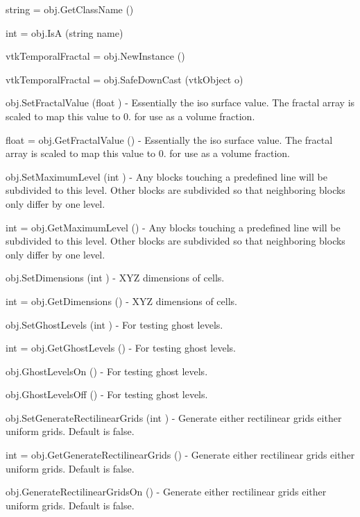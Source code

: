\begin{DoxyItemize}
\item {\ttfamily string = obj.\-Get\-Class\-Name ()}  
\item {\ttfamily int = obj.\-Is\-A (string name)}  
\item {\ttfamily vtk\-Temporal\-Fractal = obj.\-New\-Instance ()}  
\item {\ttfamily vtk\-Temporal\-Fractal = obj.\-Safe\-Down\-Cast (vtk\-Object o)}  
\item {\ttfamily obj.\-Set\-Fractal\-Value (float )} -\/ Essentially the iso surface value. The fractal array is scaled to map this value to 0. for use as a volume fraction.  
\item {\ttfamily float = obj.\-Get\-Fractal\-Value ()} -\/ Essentially the iso surface value. The fractal array is scaled to map this value to 0. for use as a volume fraction.  
\item {\ttfamily obj.\-Set\-Maximum\-Level (int )} -\/ Any blocks touching a predefined line will be subdivided to this level. Other blocks are subdivided so that neighboring blocks only differ by one level.  
\item {\ttfamily int = obj.\-Get\-Maximum\-Level ()} -\/ Any blocks touching a predefined line will be subdivided to this level. Other blocks are subdivided so that neighboring blocks only differ by one level.  
\item {\ttfamily obj.\-Set\-Dimensions (int )} -\/ X\-Y\-Z dimensions of cells.  
\item {\ttfamily int = obj.\-Get\-Dimensions ()} -\/ X\-Y\-Z dimensions of cells.  
\item {\ttfamily obj.\-Set\-Ghost\-Levels (int )} -\/ For testing ghost levels.  
\item {\ttfamily int = obj.\-Get\-Ghost\-Levels ()} -\/ For testing ghost levels.  
\item {\ttfamily obj.\-Ghost\-Levels\-On ()} -\/ For testing ghost levels.  
\item {\ttfamily obj.\-Ghost\-Levels\-Off ()} -\/ For testing ghost levels.  
\item {\ttfamily obj.\-Set\-Generate\-Rectilinear\-Grids (int )} -\/ Generate either rectilinear grids either uniform grids. Default is false.  
\item {\ttfamily int = obj.\-Get\-Generate\-Rectilinear\-Grids ()} -\/ Generate either rectilinear grids either uniform grids. Default is false.  
\item {\ttfamily obj.\-Generate\-Rectilinear\-Grids\-On ()} -\/ Generate either rectilinear grids either uniform grids. Default is false.  

\end{DoxyItemize}
